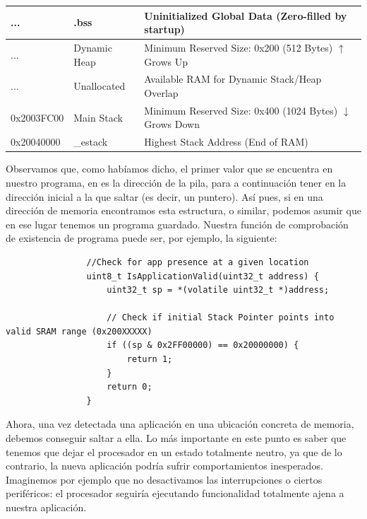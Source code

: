 \documentclass[../main.tex]{subfiles}
\begin{document}
\begin{tabularx}{\textwidth}{|>{\ttfamily}p{2cm}|>{\ttfamily}p{2.8cm}|X|}
                \rowcolor{BssGreen}
                ... & .bss & Uninitialized Global Data (Zero-filled by startup) \\ \hline
                \rowcolor{HeapOrange}
                ... & Dynamic Heap & Minimum Reserved Size: 0x200 (512 Bytes) $\uparrow$ Grows Up \\ \hline
                \rowcolor{ReservedGray}
                ... & Unallocated & Available RAM for Dynamic Stack/Heap Overlap \\ \hline
                \rowcolor{StackOrange}
                0x2003FC00 & Main Stack & Minimum Reserved Size: 0x400 (1024 Bytes) $\downarrow$ Grows Down \\ \hline
                \rowcolor{StackOrange}
                0x20040000 & \_estack  & Highest Stack Address (End of RAM) \\ \hline
            \end{tabularx}

            Observamos que, como habíamos dicho, el primer valor que se encuentra en nuestro programa, en  es la dirección de la pila, para a continuación tener en  la dirección inicial a la que saltar (es decir, un puntero). Así pues, si en una dirección de memoria encontramos esta estructura, o similar, podemos asumir que en ese lugar tenemos un programa guardado. Nuestra función de comprobación de existencia de programa puede ser, por ejemplo, la siguiente:

            \begin{lstlisting}
                //Check for app presence at a given location
                uint8_t IsApplicationValid(uint32_t address) {
                    uint32_t sp = *(volatile uint32_t *)address;

                    // Check if initial Stack Pointer points into valid SRAM range (0x200XXXXX)
                    if ((sp & 0x2FF00000) == 0x20000000) {
                        return 1;
                    }
                    return 0;
                }
            \end{lstlisting}

            Ahora, una vez detectada una aplicación en una ubicación concreta de memoria, debemos conseguir saltar a ella. Lo más importante en este punto es saber que tenemos que dejar el procesador en un estado totalmente neutro, ya que de lo contrario, la nueva aplicación podría sufrir comportamientos inesperados. Imaginemos por ejemplo que no desactivamos las interrupciones o ciertos periféricos: el procesador seguiría ejecutando funcionalidad totalmente ajena a nuestra aplicación.
\end{document}
